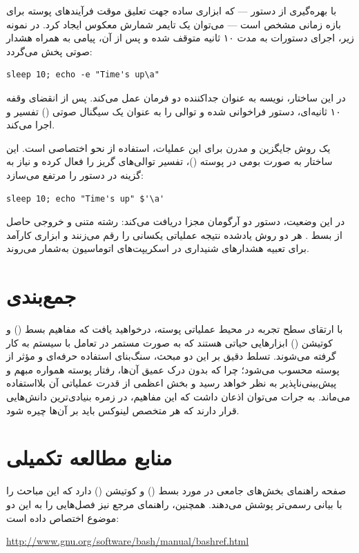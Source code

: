 با بهره‌گیری از دستور  — که ابزاری ساده جهت تعلیق موقت فرآیندهای پوسته برای بازه زمانی مشخص است — می‌توان یک تایمر شمارش معکوس ایجاد کرد. در نمونه زیر، اجرای دستورات به مدت ۱۰ ثانیه متوقف شده و پس از آن، پیامی به همراه هشدار صوتی پخش می‌گردد:

\begin{latin}
\begin{lstlisting}
sleep 10; echo -e "Time's up\a"
\end{lstlisting}
\end{latin}

در این ساختار، نویسه \cmd{;} به عنوان جداکننده دو فرمان عمل می‌کند. پس از انقضای وقفه ۱۰ ثانیه‌ای، دستور  فراخوانی شده و توالی  را به عنوان یک سیگنال صوتی () تفسیر و اجرا می‌کند.

یک روش جایگزین و مدرن برای این عملیات، استفاده از نحو اختصاصی  است. این ساختار به صورت بومی در پوسته ()، تفسیر توالی‌های گریز را فعال کرده و نیاز به گزینه  در دستور  را مرتفع می‌سازد:

\begin{latin}
\begin{lstlisting}
sleep 10; echo "Time's up" $'\a'
\end{lstlisting}
\end{latin}

در این وضعیت، دستور  دو آرگومان مجزا دریافت می‌کند: رشته متنی  و خروجی حاصل از بسط . هر دو روش یادشده نتیجه عملیاتی یکسانی را رقم می‌زنند و ابزاری کارآمد برای تعبیه هشدارهای شنیداری در اسکریپت‌های اتوماسیون به‌شمار می‌روند.

\section{جمع‌بندی}

با ارتقای سطح تجربه در محیط عملیاتی پوسته، درخواهید یافت که مفاهیم بسط () و کوتیشن () ابزارهایی حیاتی هستند که به صورت مستمر در تعامل با سیستم به کار گرفته می‌شوند. تسلط دقیق بر این دو مبحث، سنگ‌بنای استفاده حرفه‌ای و مؤثر از پوسته محسوب می‌شود؛ چرا که بدون درک عمیق آن‌ها، رفتار پوسته همواره مبهم و پیش‌بینی‌ناپذیر به نظر خواهد رسید و بخش اعظمی از قدرت عملیاتی آن بلااستفاده می‌ماند. به جرات می‌توان اذعان داشت که این مفاهیم، در زمره بنیادی‌ترین دانش‌هایی قرار دارند که هر متخصص لینوکس باید بر آن‌ها چیره شود.

\section{منابع مطالعه تکمیلی}

صفحه راهنمای  بخش‌های جامعی در مورد بسط () و کوتیشن () دارد که این مباحث را با بیانی رسمی‌تر پوشش می‌دهند. همچنین، راهنمای مرجع  نیز فصل‌هایی را به این دو موضوع اختصاص داده است:

\begin{latin}
\url{http://www.gnu.org/software/bash/manual/bashref.html}
\end{latin}